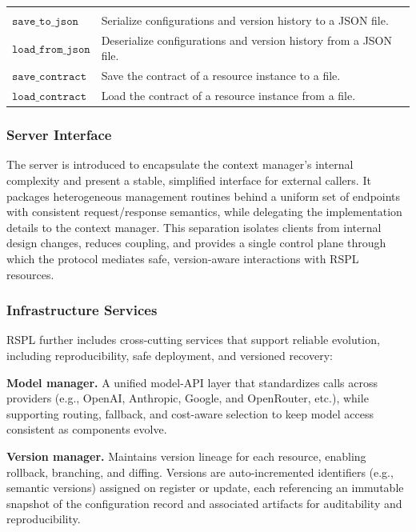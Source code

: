 \begin{table}[h]
\begin{tabular}{p{2.5cm}p{10.5cm}}
\midrule
\rowcolor{gray!15} \multicolumn{2}{c}{\textbf{Serialization}} \\
$\mathtt{save\_to\_json}$ & Serialize configurations and version history to a JSON file. \\
$\mathtt{load\_from\_json}$ & Deserialize configurations and version history from a JSON file. \\
$\mathtt{save\_contract}$ & Save the contract of a resource instance to a file. \\
$\mathtt{load\_contract}$ & Load the contract of a resource instance from a file. \\
\bottomrule
\end{tabular}
\end{table}

\subsubsection{Server Interface}
\label{appx_sec:server-interface}

The server is introduced to encapsulate the context manager's internal complexity and present a stable, simplified interface for external callers. It packages heterogeneous management routines behind a uniform set of endpoints with consistent request/response semantics, while delegating the implementation details to the context manager. This separation isolates clients from internal design changes, reduces coupling, and provides a single control plane through which the protocol mediates safe, version-aware interactions with RSPL resources.

\subsubsection{Infrastructure Services}

RSPL further includes cross-cutting services that support reliable evolution, including reproducibility, safe deployment, and versioned recovery:

\textbf{Model manager.} A unified model-API layer that standardizes calls across providers (e.g., OpenAI, Anthropic, Google, and OpenRouter, etc.), while supporting routing, fallback, and cost-aware selection to keep model access consistent as components evolve.

\textbf{Version manager.} Maintains version lineage for each resource, enabling rollback, branching, and diffing. Versions are auto-incremented identifiers (e.g., semantic versions) assigned on register or update, each referencing an immutable snapshot of the configuration record and associated artifacts for auditability and reproducibility.

